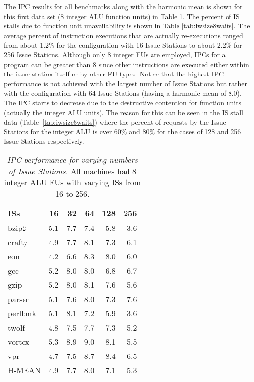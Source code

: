 \documentclass[10pt,dvips]{article}
\begin{document}
The IPC results for all 
benchmarks along with the harmonic mean 
is shown for this first data set (8 integer ALU function units)
in Table \ref{tab:iwsize8ipc}.
The percent of IS stalls due to function unit unavailability
is shown in Table \ref{tab:iwsize8waits}.
The average percent of instruction executions that are 
actually re-executions ranged from about 1.2\% for the configuration
with 16 Issue Stations to about 2.2\% for 256 Issue Stations.
Although only 8 integer FUs are employed, IPCs for a program
can be greater than 8 since other instructions are executed
either within the issue station itself or by other FU types.
Notice that the highest IPC performance is not achieved with
the largest number of Issue Stations but rather with the configuration
with 64 Issue Stations (having a harmonic mean of 8.0).  
The IPC starts to decrease due to
the destructive contention for function units (actually the integer
ALU units).
The reason for this can be seen in the IS stall 
data (Table~\ref{tab:iwsize8waits}) where the percent of
requests by the Issue Stations for the integer ALU is over
60\% and 80\% for the cases of 128 and 256 Issue Stations
respectively.
%
\begin{table}[p]
\begin{center}
\caption{{\em IPC performance for varying numbers of
Issue Stations.}
All machines had 8 integer ALU FUs with varying ISs from 16 to 256.}
\label{tab:iwsize8ipc}
\vspace{+0.1in}
\begin{tabular}{|l||r|r|r|r|r|}
\hline 
{ISs}& 16 & 32 & 64 & 128 & 256 \\
\hline

\hline
bzip2&
5.1 & 7.7 & 7.4 & 5.8 & 3.6 \\

\hline
crafty&
4.9 & 7.7 & 8.1 & 7.3 & 6.1 \\

\hline
eon&
4.2 & 6.6 & 8.3 & 8.0 & 6.0 \\

\hline
gcc&
5.2 & 8.0 & 8.0 & 6.8 & 6.7 \\

\hline
gzip&
5.2 & 8.0 & 8.1 & 7.6 & 5.6 \\

\hline
parser&
5.1 & 7.6 & 8.0 & 7.3 & 7.6 \\

\hline
perlbmk&
5.1 & 8.1 & 7.2 & 5.9 & 3.6 \\

\hline
twolf&
4.8 & 7.5 & 7.7 & 7.3 & 5.2 \\

\hline
vortex&
5.3 & 8.9 & 9.0 & 8.1 & 5.5 \\

\hline
vpr&
4.7 & 7.5 & 8.7 & 8.4 & 6.5 \\

\hline
H-MEAN&
4.9 & 7.7 & 8.0 & 7.1 & 5.3 \\

\hline
\end{tabular}
\end{center}
\end{table}
\end{document}
